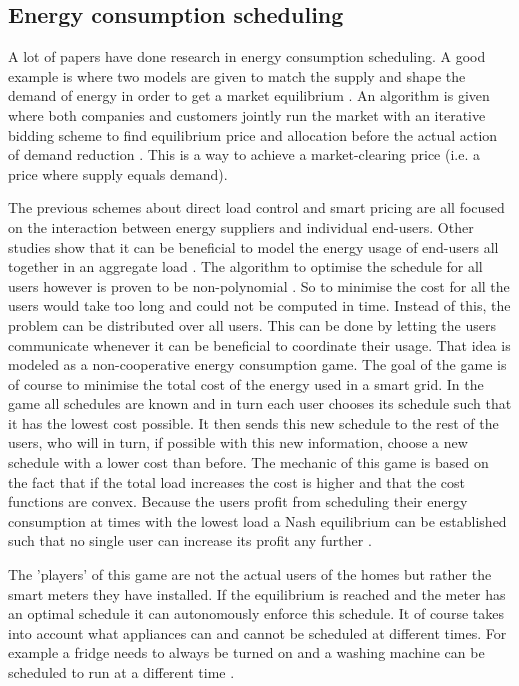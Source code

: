 \subsection{Energy consumption scheduling}
A lot of papers have done research in energy consumption scheduling. A good example is where two models are given to match the supply and shape the demand of energy in order to get a market equilibrium \cite{ChenLiLowEtAl2010}. An algorithm is given where both companies and customers jointly run the market with an iterative bidding scheme to find equilibrium price and allocation before the actual action of demand reduction \cite{ChenLiLowEtAl2010}. This is a way to achieve a market-clearing price (i.e. a price where supply equals demand).

The previous schemes about direct load control and smart pricing are all focused on the interaction between energy suppliers and individual end-users. Other studies show that it can be beneficial to model the energy usage of end-users all together in an aggregate load \cite{Mohsenian-RadWongJatskevichEtAl2010a, SalinasLiLi2013}. The algorithm to optimise the schedule for all users however is proven to be non-polynomial \cite{CaronKesidis2010}. So to minimise the cost for all the users would take too long and could not be computed in time. Instead of this, the problem can be distributed over all users. This can be done by letting the users communicate whenever it can be beneficial to coordinate their usage. That idea is modeled as a non-cooperative energy consumption game. The goal of the game is of course to minimise the total cost of the energy used in a smart grid. In the game all schedules are known and in turn each user chooses its schedule such that it has the lowest cost possible. It then sends this new schedule to the rest of the users, who will in turn, if possible with this new information, choose a new schedule with a lower cost than before. The mechanic of this game is based on the fact that if the total load increases the cost is higher and that the cost functions are convex. Because the users profit from scheduling their energy consumption at times with the lowest load a Nash equilibrium can be established such that no single user can increase its profit any further \cite{Mohsenian-RadWongJatskevichEtAl2010a}.

The 'players' of this game are not the actual users of the homes but rather the smart meters they have installed. If the equilibrium is reached and the meter has an optimal schedule it can autonomously enforce this schedule. It of course takes into account what appliances can and cannot be scheduled at different times. For example a fridge needs to always be turned on and a washing machine can be scheduled to run at a different time \cite{DepuruWangDevabhaktuni2011a}. 
